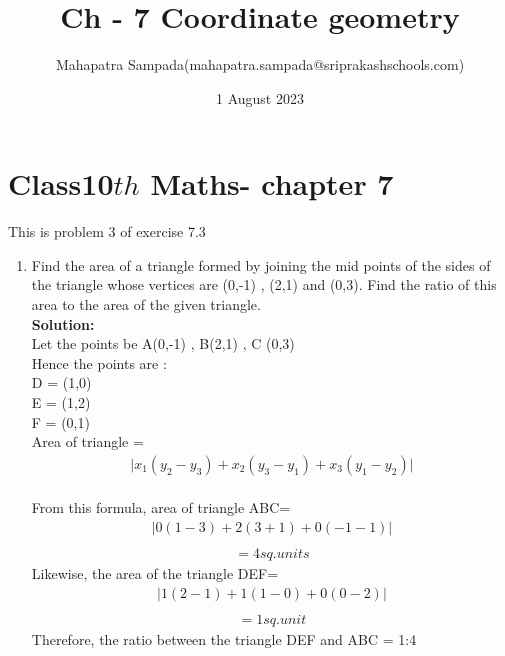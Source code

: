 \documentclass{article}
\title{Ch - 7 Coordinate geometry}
\author{Mahapatra Sampada(mahapatra.sampada@sriprakashschools.com)}
\date{1 August 2023}
\newcommand{\solution}{\noindent \textbf{Solution: }}
\begin{document}
\maketitle
\section*{Class10${th}$ Maths- chapter 7}
This is problem 3 of exercise 7.3
\begin{enumerate}
\item Find the area of a triangle formed by joining the mid points of the sides of the triangle whose vertices are (0,-1) , (2,1) and (0,3). Find the ratio of this area to the area of the given triangle. \\

\solution\\
Let the points be A(0,-1) , B(2,1) , C (0,3)\\ 
Hence the points are :\\
D = (1,0)\\
E = (1,2)\\
F = (0,1)\\
    Area of triangle = \begin{align}
    [\frac{1}{2}]\lvert x_1(y_2 - y_3)+x_2(y_3 - y_1)+x_3(y_1 - y_2)\rvert
\end{align}\\
From this formula, area of triangle ABC=
\begin{align}
 [\frac{1}{2}] \lvert  0(1-3)+ 2(3+1)+ 0(-1-1)\rvert\\
 \end{align}
 \begin{align}
 = 4 sq.units
 \end{align}
Likewise, the area of the triangle DEF= 
\begin{align}
[\frac{1}{2}] \lvert  1(2-1)+ 1(1-0)+ 0(0-2)\rvert\\
\end{align}
\begin{align}
 = 1 sq.unit
 \end{align}
 Therefore, the ratio between the triangle DEF and ABC = 1:4 
\end{enumerate}
\end{document}

